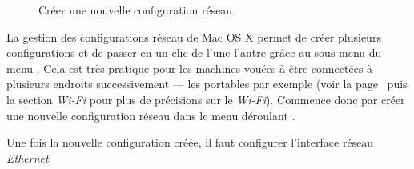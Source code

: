 \noindent
  \begin{figure*}[h]
    \begin{center}  
        \caption{Cr\'eer une nouvelle configuration r\'eseau}

    \end{center}
  \end{figure*}

\pagebreak

La gestion des configurations r\'eseau de Mac OS X permet de cr\'eer plusieurs configurations et de passer en un clic de l'une  l'autre gr\^ace au sous-menu  du menu . Cela est tr\`es pratique pour les machines vou\'ees \`a  \^etre connect\'ees \`a  plusieurs endroits successivement --- les portables par exemple (voir la page~\pageref{wifi} puis la section \emph{Wi-Fi} pour plus de pr\'ecisions sur le \emph{Wi-Fi}). Commence donc par cr\'eer une nouvelle configuration r\'eseau dans le menu d\'eroulant .



Une fois la nouvelle configuration cr\'e\'ee, il faut configurer l'interface r\'eseau \emph{Ethernet}.



